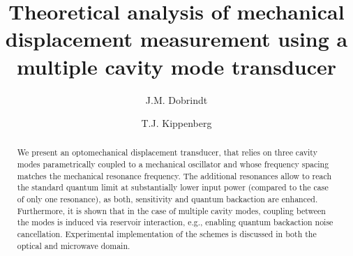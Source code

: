 \documentclass[twocolumn,english,aps,prl,superscriptaddress,showpacs,preprintnumbers]{revtex4}
\begin{document}
\title{Theoretical analysis of mechanical displacement measurement using a multiple cavity
mode transducer}

\author{J.M. Dobrindt}


\author{T.J. Kippenberg}



\begin{abstract}
We present an optomechanical displacement transducer, that relies
on three cavity modes parametrically coupled to a mechanical oscillator and whose
frequency spacing matches the mechanical resonance frequency. The additional resonances
allow to reach the standard quantum limit at substantially lower input power
(compared to the case of only one resonance), as both, sensitivity
and quantum backaction are enhanced. Furthermore, it is shown that 
in the case of multiple cavity modes, coupling between the modes is 
induced via reservoir interaction, e.g., enabling quantum backaction 
noise cancellation. Experimental implementation of the
schemes is discussed in both the optical and microwave domain.
\end{abstract}


\maketitle
\end{document}
